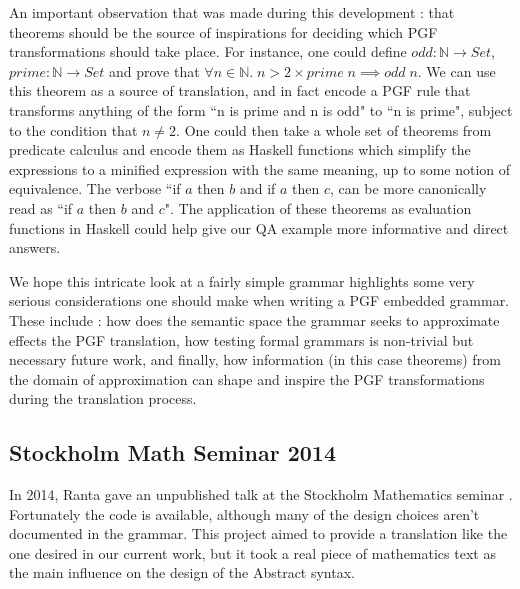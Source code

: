 An important observation that was made during this development : that theorems
should be the source of inspirations for deciding which PGF transformations
should take place. For instance, one could define $odd : \mathds{N}
\rightarrow Set$, $prime : \mathds{N} \rightarrow Set$ and prove that $\forall n
\in \mathds{N}.\; n > 2 \times prime\; n \implies odd\; n$. We can use this
theorem as a source of translation, and in fact encode a PGF rule that
transforms anything of the form ``n is prime and n is odd" to ``n is prime",
subject to the condition that $n \neq 2$. One could then take a whole set of
theorems from predicate calculus and encode them as Haskell functions which
simplify the expressions to a minified expression with the
same meaning, up to some notion of equivalence. The verbose ``if $a$ then $b$
and if $a$ then $c$, can be more canonically read as ``if $a$ then $b$ and $c$".
The application of these theorems as evaluation functions in Haskell could
help give our QA example more informative and direct answers.

We hope this intricate look at a fairly simple grammar highlights some very
serious considerations one should make when writing a PGF embedded grammar.
These include : how does the semantic space the grammar seeks to approximate
effects the PGF translation, how testing formal grammars is non-trivial but
necessary future work, and finally, how information (in this case theorems) from
the domain of approximation can shape and inspire the PGF transformations 
during the translation process.



\subsection{Stockholm Math Seminar 2014}

In 2014, Ranta gave an unpublished talk at the Stockholm Mathematics seminar
\cite{aarneHott}. Fortunately the code is available, although many of the design
choices aren't documented in the grammar. This project aimed to provide a
translation like the one desired in our current work, but it took a real piece
of mathematics text as the main influence on the design of the Abstract syntax.

